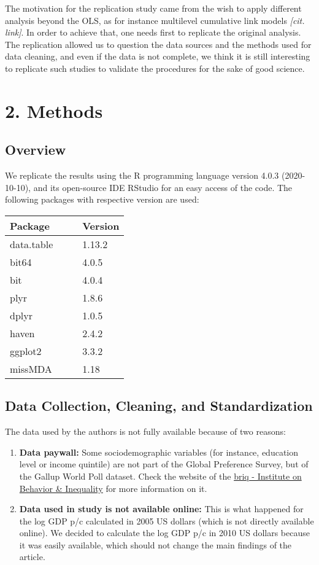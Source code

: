 \documentclass[
  11pt,
]{article}
\begin{document}
The motivation for the replication study came from the wish to apply
different analysis beyond the OLS, as for instance multilevel cumulative
link models \emph{{[}cit. link{]}}. In order to achieve that, one needs
first to replicate the original analysis. The replication allowed us to
question the data sources and the methods used for data cleaning, and
even if the data is not complete, we think it is still interesting to
replicate such studies to validate the procedures for the sake of good
science.

\hypertarget{methods}{%
\section{2. Methods}\label{methods}}

\hypertarget{overview}{%
\subsection{Overview}\label{overview}}

We replicate the results using the R programming language version 4.0.3
(2020-10-10), and its open-source IDE RStudio for an easy access of the
code. The following packages with respective version are used:

\begin{longtable}[]{@{}lll@{}}
\toprule
Package & \(\quad\) & Version\tabularnewline
\midrule
\endhead
data.table & & 1.13.2\tabularnewline
bit64 & & 4.0.5\tabularnewline
bit & & 4.0.4\tabularnewline
plyr & & 1.8.6\tabularnewline
dplyr & & 1.0.5\tabularnewline
haven & & 2.4.2\tabularnewline
ggplot2 & & 3.3.2\tabularnewline
missMDA & & 1.18\tabularnewline
\bottomrule
\end{longtable}

\hypertarget{data-collection-cleaning-and-standardization}{%
\subsection{Data Collection, Cleaning, and
Standardization}\label{data-collection-cleaning-and-standardization}}

The data used by the authors is not fully available because of two
reasons:

\begin{enumerate}
\def\labelenumi{\arabic{enumi}.}
\item
  \textbf{Data paywall:} Some sociodemographic variables (for instance,
  education level or income quintile) are not part of the Global
  Preference Survey, but of the Gallup World Poll dataset. Check the
  website of the
  \href{https://www.briq-institute.org/global-preferences/home}{briq -
  Institute on Behavior \& Inequality} for more information on it.
\item
  \textbf{Data used in study is not available online:} This is what
  happened for the log GDP p/c calculated in 2005 US dollars (which is
  not directly available online). We decided to calculate the log GDP
  p/c in 2010 US dollars because it was easily available, which should
  not change the main findings of the article.
\end{enumerate}
\end{document}
